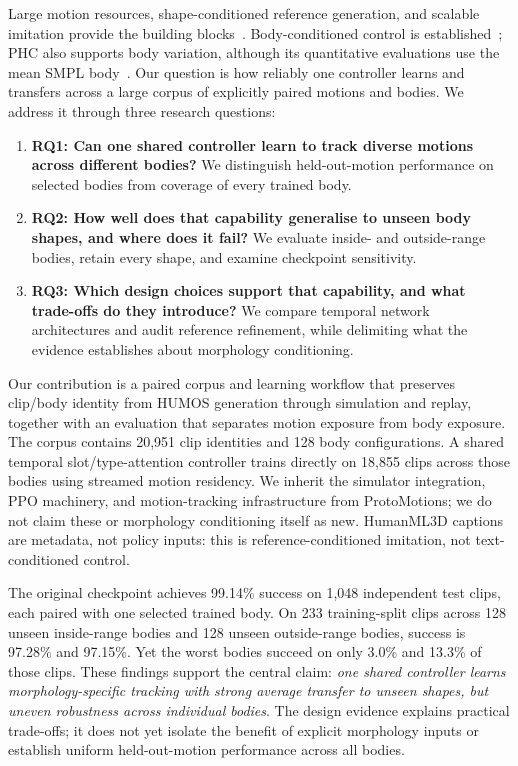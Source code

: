 \documentclass[11pt]{article}
\begin{document}
Large motion resources, shape-conditioned reference generation, and scalable
imitation provide the building blocks~\cite{amass,humanml3d,humos,phc,protomotions}.
Body-conditioned control is established~\cite{won2019}; PHC also supports
body variation, although its quantitative evaluations use the mean SMPL
body~\cite{phc}. Our question is how reliably one controller learns and
transfers across a large corpus of explicitly paired motions and bodies.
We address it through three research questions:
\begin{enumerate}
\item \textbf{RQ1: Can one shared controller learn to track diverse motions
across different bodies?} We distinguish held-out-motion performance on
selected bodies from coverage of every trained body.
\item \textbf{RQ2: How well does that capability generalise to unseen body
shapes, and where does it fail?} We evaluate inside- and outside-range bodies,
retain every shape, and examine checkpoint sensitivity.
\item \textbf{RQ3: Which design choices support that capability, and what
trade-offs do they introduce?} We compare temporal network architectures and audit reference refinement,
while delimiting what the evidence establishes about morphology conditioning.
\end{enumerate}

Our contribution is a paired corpus and learning workflow that preserves
clip/body identity from HUMOS generation through simulation and replay,
together with an evaluation that separates motion exposure from body
exposure. The corpus contains 20,951 clip identities and 128 body
configurations. A shared temporal slot/type-attention controller trains
directly on 18,855 clips across those bodies using streamed motion residency.
We inherit the simulator integration, PPO machinery, and motion-tracking
infrastructure from ProtoMotions; we do not claim these or morphology
conditioning itself as new. HumanML3D captions are metadata, not policy
inputs: this is reference-conditioned imitation, not text-conditioned control.

The original checkpoint achieves 99.14\% success on 1,048 independent test
clips, each paired with one selected trained body. On 233 training-split
clips across 128 unseen inside-range bodies and 128 unseen outside-range
bodies, success is 97.28\% and 97.15\%. Yet the worst bodies succeed on only
3.0\% and 13.3\% of those clips. These findings support the central claim:
\emph{one shared controller learns morphology-specific tracking with strong
average transfer to unseen shapes, but uneven robustness across individual
bodies}. The design evidence explains practical trade-offs; it does not yet
isolate the benefit of explicit morphology inputs or establish uniform
held-out-motion performance across all bodies.
\end{document}
